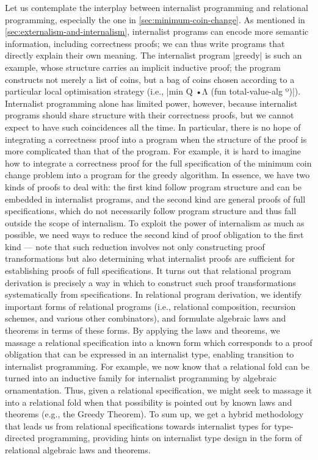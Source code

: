 Let us contemplate the interplay between internalist programming and relational programming, especially the one in \autoref{sec:minimum-coin-change}.
As mentioned in \autoref{sec:externalism-and-internalism}, internalist programs can encode more semantic information, including correctness proofs; we can thus write programs that directly explain their own meaning.
The internalist program |greedy| is such an example, whose structure carries an implicit inductive proof; the program constructs not merely a list of coins, but a bag of coins chosen according to a particular local optimisation strategy (i.e., |min Q •Λ (fun total-value-alg º)|).
Internalist programming alone has limited power, however, because internalist programs should share structure with their correctness proofs, but we cannot expect to have such coincidences all the time.
In particular, there is no hope of integrating a correctness proof into a program when the structure of the proof is more complicated than that of the program.
For example, it is hard to imagine how to integrate a correctness proof for the full specification of the minimum coin change problem into a program for the greedy algorithm.
In essence, we have two kinds of proofs to deal with: the first kind follow program structure and can be embedded in internalist programs, and the second kind are general proofs of full specifications, which do not necessarily follow program structure and thus fall outside the scope of internalism.
To exploit the power of internalism as much as possible, we need ways to reduce the second kind of proof obligation to the first kind --- note that such reduction involves not only constructing proof transformations but also determining what internalist proofs are sufficient for establishing proofs of full specifications.
It turns out that relational program derivation is precisely a way in which to construct such proof transformations systematically from specifications.
In relational program derivation, we identify important forms of relational programs (i.e., relational composition, recursion schemes, and various other combinators), and formulate algebraic laws and theorems in terms of these forms.
By applying the laws and theorems, we massage a relational specification into a known form which corresponds to a proof obligation that can be expressed in an internalist type, enabling transition to internalist programming.
For example, we now know that a relational fold can be turned into an inductive family for internalist programming by algebraic ornamentation.
Thus, given a relational specification, we might seek to massage it into a relational fold when that possibility is pointed out by known laws and theorems (e.g., the Greedy Theorem).
To sum up, we get a hybrid methodology that leads us from relational specifications towards internalist types for type-directed programming, providing hints on internalist type design in the form of relational algebraic laws and theorems.
